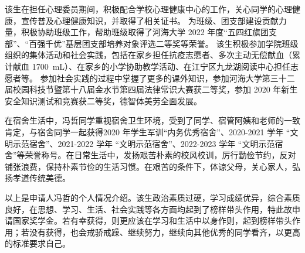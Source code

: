\documentclass[12pt]{ctexart}
\begin{document}
该生在担任心理委员期间，积极配合学校心理健康中心的工作，关心同学的心理健康，宣传普及心理健康知识，并取得了相关证书。
为班级、团支部建设贡献力量，积极协助班级工作，帮助班级取得了河海大学 2022 年度“五四红旗团支部”、“百强千优”基层团支部培养对象评选二等奖等荣誉。
该生积极参加学院班级组织的集体活动和社会实践，包括在家乡担任抗疫志愿者、多次主动无偿献血（累计献血 \SI{1700}{\milli\liter}）、在家乡的小学协助教学活动、在江宁区九龙湖阅读中心担任志愿者等。
参加社会实践的过程中掌握了更多的课外知识，参加河海大学第三十二届校园科技节暨第十八届金水节第四届法律常识大赛获二等奖，参加 2020 年新生安全知识测试和竞赛获二等奖，德智体美劳全面发展。

在宿舍生活中，冯哲同学重视宿舍卫生环境，受到了同学、宿管阿姨和老师的一致肯定，与宿舍同学一起获得2020 年学生军训“内务优秀宿舍”、2020-2021 学年 “文明示范宿舍”、2021-2022 学年 “文明示范宿舍”、2022-2023 学年 “文明示范宿舍”等荣誉称号。在日常生活中，发扬艰苦朴素的校风校训，厉行勤俭节约，反对铺张浪费，保持朴素节俭的生活习惯。在艰苦的条件下，体谅父母，关心家人，弘扬孝道传统美德。

以上是申请人冯哲的个人情况介绍。该生政治素质过硬，学习成绩优异，综合素质良好，在思想、学习、生活、社会实践等各方面均起到了榜样带头作用，特此故申请国家奖学金。若有幸获得，则更应该在学习和生活中以身作则，起到榜样带头作用；若没有获得，也会戒骄戒躁、继续努力，继续向其他优秀的同学看齐，以更高的标准要求自己。
\end{document}
